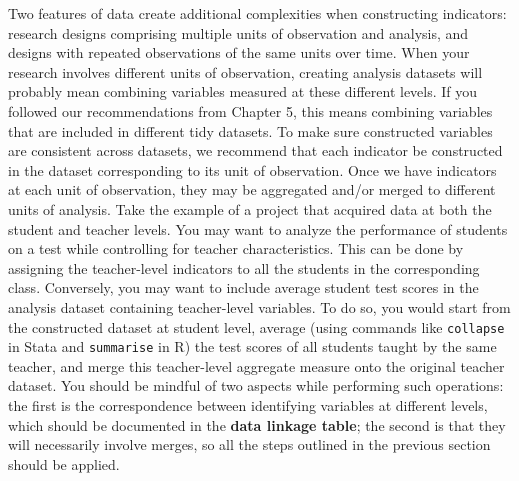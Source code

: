 Two features of data create additional complexities when constructing indicators:
research designs comprising multiple units of observation and analysis,
and designs with repeated observations of the same units over time.
When your research involves different units of observation,
creating analysis datasets will probably mean combining variables measured at these different levels.
If you followed our recommendations from Chapter 5,
this means combining variables that are included in different tidy datasets.
To make sure constructed variables are consistent across datasets,
we recommend that each indicator be constructed in the dataset corresponding to its unit of observation.
Once we have indicators at each unit of observation,
they may be aggregated and/or merged to different units of analysis.
Take the example of a project that acquired data at both the student and teacher levels.
You may want to analyze the performance of students on a test
while controlling for teacher characteristics.
This can be done by assigning the teacher-level indicators to all the students in the corresponding class.
Conversely, you may want to include average student test scores
in the analysis dataset containing teacher-level variables.
To do so, you would start from the constructed dataset at student level,
average (using commands like \texttt{collapse} in Stata and \texttt{summarise} in R) 
the test scores of all students taught by the same teacher,
and merge this teacher-level aggregate measure onto the original teacher dataset.
You should be mindful of two aspects while performing such operations:
the first is the correspondence between identifying variables at different levels, 
which should be documented in the \textbf{data linkage table};
the second is that they will necessarily involve merges,
so all the steps outlined in the previous section should be applied.

